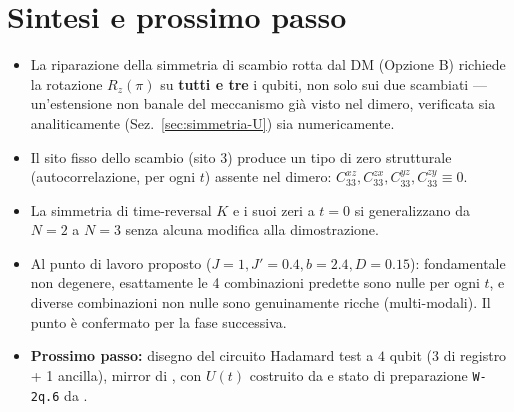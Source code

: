 \documentclass[11pt,a4paper]{article}
\begin{document}
\begin{center}
\renewcommand{\arraystretch}{1.15}
\end{center}

\section{Sintesi e prossimo passo}

\begin{itemize}
\item La riparazione della simmetria di scambio rotta dal DM (Opzione B) richiede la rotazione
$R_z(\pi)$ su \textbf{tutti e tre} i qubiti, non solo sui due scambiati --- un'estensione non
banale del meccanismo già visto nel dimero, verificata sia analiticamente
(Sez.~\ref{sec:simmetria-U}) sia numericamente.
\item Il sito fisso dello scambio (sito 3) produce un tipo di zero strutturale
(autocorrelazione, per ogni $t$) assente nel dimero: $C_{33}^{xz},C_{33}^{zx},C_{33}^{yz},C_{33}^{zy}\equiv0$.
\item La simmetria di time-reversal $K$ e i suoi zeri a $t=0$ si generalizzano da $N=2$ a $N=3$
senza alcuna modifica alla dimostrazione.
\item Al punto di lavoro proposto ($J{=}1,J'{=}0.4,b{=}2.4,D{=}0.15$): fondamentale non
degenere, esattamente le 4 combinazioni predette sono nulle per ogni $t$, e diverse
combinazioni non nulle sono genuinamente ricche (multi-modali). Il punto è confermato per la
fase successiva.
\item \textbf{Prossimo passo:} disegno del circuito Hadamard test a $4$ qubit (3 di registro +
1 ancilla), mirror di \texttt{}, con $U(t)$
costruito da \texttt{} e stato di preparazione
\texttt{W-2q.6} da \texttt{}.
\end{itemize}
\end{document}

